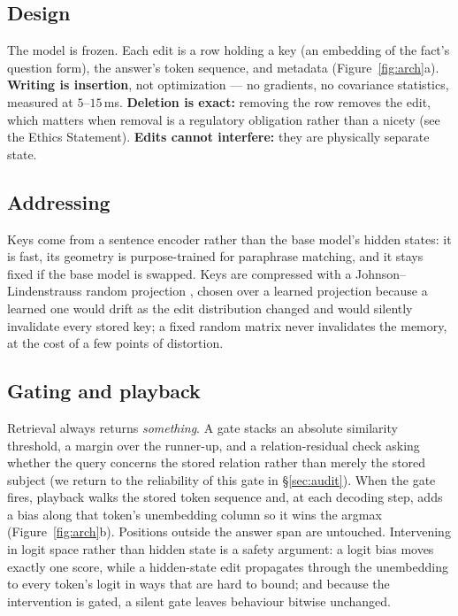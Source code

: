 \documentclass[11pt]{article}
\begin{document}
\subsection{Design}
The model is frozen. Each edit is a row holding a key (an embedding of the
fact's question form), the answer's token sequence, and metadata
(Figure~\ref{fig:arch}a). \textbf{Writing is insertion}, not optimization ---
no gradients, no covariance statistics, measured at $5$--$15$\,ms.
\textbf{Deletion is exact:} removing the row removes the edit, which matters
when removal is a regulatory obligation rather than a nicety (see the Ethics
Statement). \textbf{Edits cannot interfere:} they are physically separate
state.

\subsection{Addressing}
Keys come from a sentence encoder \citep{reimers2019sbert} rather than the
base model's hidden states: it is fast, its geometry is purpose-trained for
paraphrase matching, and it stays fixed if the base model is swapped. Keys
are compressed with a Johnson--Lindenstrauss random projection
\citep{johnson1984jl}, chosen over a learned projection because a learned one
would drift as the edit distribution changed and would silently invalidate
every stored key; a fixed random matrix never invalidates the memory, at the
cost of a few points of distortion.

\subsection{Gating and playback}
Retrieval always returns \emph{something}. A gate stacks an absolute
similarity threshold, a margin over the runner-up, and a relation-residual
check asking whether the query concerns the stored relation rather than
merely the stored subject (we return to the reliability of this gate in
\S\ref{sec:audit}). When the gate fires, playback walks the stored token
sequence and, at each decoding step, adds a bias along that token's
unembedding column so it wins the argmax (Figure~\ref{fig:arch}b). Positions
outside the answer span are untouched. Intervening in logit space rather
than hidden state is a safety argument: a logit bias moves exactly one
score, while a hidden-state edit propagates through the unembedding to every
token's logit in ways that are hard to bound; and because the intervention is
gated, a silent gate leaves behaviour bitwise unchanged.
\end{document}
